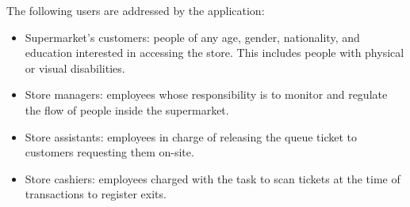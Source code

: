 \documentclass[../../main.tex]{subfiles}
\begin{document}
	The following users are addressed by the application:
	\begin{itemize}
		\item Supermarket's customers: people of any age, gender, nationality, and education interested in accessing the store. This includes people with physical or visual disabilities.
		\item Store managers: employees whose responsibility is to monitor and regulate the flow of people inside the supermarket.
		\item Store assistants: employees in charge of releasing the queue ticket to customers requesting them on-site.
		\item Store cashiers: employees charged with the task to scan tickets at the time of transactions to register exits.
	\end{itemize}
\end{document}
